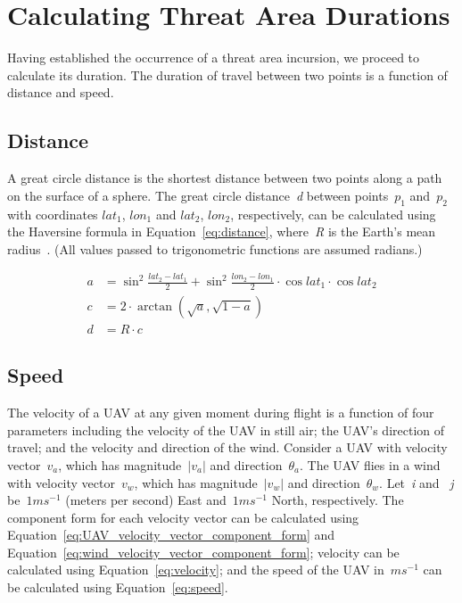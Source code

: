 \section{Calculating Threat Area Durations}

Having established the occurrence of a threat area incursion, we proceed to calculate its duration. The duration of travel between two points is a function of distance and speed.

\subsection{Distance}
\label{sec:Distance}

A great circle distance is the shortest distance between two points along a path on the surface of a sphere. The great circle distance~\emph{d} between points~$p_1$ and~$p_2$ with coordinates $lat_1$, $lon_1$ and $lat_2$, $lon_2$, respectively, can be calculated using the Haversine formula in Equation~\ref{eq:distance}, where~\emph{R} is the Earth's mean radius~\cite{Veness}. (All values passed to trigonometric functions are assumed radians.)

\begin{figure}[ht]
	\begin{align}
		\label{eq:distance}
			\nonumber a & = \sin^2 \frac{lat_2 - lat_1}{2} + \sin^2 \frac{lon_2 - lon_1}{2} \cdot \cos lat_1 \cdot \cos lat_2\\
			\nonumber c & = 2 \cdot \arctan(\sqrt{a}, \sqrt{1 - a})\\
			d & = R \cdot c
	\end{align}
\end{figure}

\subsection{Speed}

The velocity of a UAV at any given moment during flight is a function of four parameters including the velocity of the UAV in still air; the UAV's direction of travel; and the velocity and direction of the wind. Consider a UAV with velocity vector~$v_a$, which has magnitude~$|v_a|$ and direction~$\theta_a$. The UAV flies in a wind with velocity vector~$v_w$, which has magnitude~$|v_w|$ and direction~$\theta_w$. Let~\emph{i} and ~\emph{j} be~$1 ms^{-1}$ (meters per second) East and~$1 ms^{-1}$ North, respectively. The component form for each velocity vector can be calculated using Equation~\ref{eq:UAV_velocity_vector_component_form} and Equation~\ref{eq:wind_velocity_vector_component_form}; velocity can be calculated using Equation~\ref{eq:velocity}; and the speed of the UAV in~$ms^{-1}$ can be calculated using Equation~\ref{eq:speed}.

